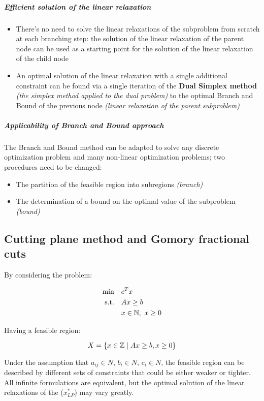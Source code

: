 \documentclass[english]{article}
\begin{document}
\subparagraph*{Efficient solution of the linear relaxation}
\begin{itemize}
  \item There's no need to solve the linear relaxations of the \ILP subproblem from scratch at each branching step: the solution of the linear relaxation of the parent node can be used as a starting point for the solution of the linear relaxation of the child node
  \item An optimal solution of the linear relaxation with a single additional constraint can be found via a single iteration of the \textbf{Dual Simplex method} \textit{(the simplex method applied to the dual problem)} to the optimal Branch and Bound of the previous node \textit{(linear relaxation of the parent subproblem)}
\end{itemize}

\subparagraph*{Applicability of Branch and Bound approach}

The Branch and Bound method can be adapted to solve any discrete optimization problem and many non-linear optimization problems;
two procedures need to be changed:

\begin{itemize}
  \item The partition of the feasible region into subregions \textit{(branch)}
  \item The determination of a bound on the optimal value of the subproblem \textit{(bound)}
\end{itemize}

\subsection{Cutting plane method and Gomory fractional cuts}

By considering the \ILP problem:

\begin{gather*}
  \begin{aligned}
    \min \quad        & c^T x                \\
    \text{s.t.} \quad & Ax \geq b            \\
                      & x \in \mathbb{N}, \ x \geq 0
  \end{aligned}
\end{gather*}

Having a feasible region:

\[ X = \left\{ x \in \mathbb{Z} \mid Ax \geq b,x \geq 0 \right\} \]

Under the assumption that \(a_{ij} \in N\), \(b_i \in N\), \(c_i \in N\), the feasible region can be described by different sets of constraints that could be either weaker or tighter.
All infinite formulations are equivalent, but the optimal solution of the linear relaxations of the \ILP (\(x^\ast_{LP}\)) may vary greatly.
\end{document}
